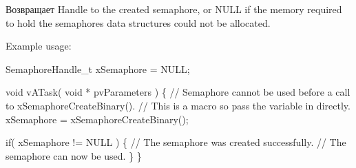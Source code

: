 \begin{DoxyReturn}{Возвращает}
Handle to the created semaphore, or N\+U\+LL if the memory required to hold the semaphore\textquotesingle{}s data structures could not be allocated.
\end{DoxyReturn}
Example usage\+: 
\begin{DoxyPre}
SemaphoreHandle\_t xSemaphore = NULL;\end{DoxyPre}



\begin{DoxyPre}void vATask( void * pvParameters )
\{
   // Semaphore cannot be used before a call to xSemaphoreCreateBinary().
   // This is a macro so pass the variable in directly.
   xSemaphore = xSemaphoreCreateBinary();\end{DoxyPre}



\begin{DoxyPre}   if( xSemaphore != NULL )
   \{
       // The semaphore was created successfully.
       // The semaphore can now be used.
   \}
\}
\end{DoxyPre}
 